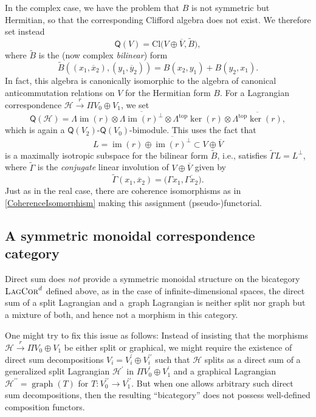 \documentclass[10pt,a4paper]{amsart}
\numberwithin{equation}{section}
\DeclareMathOperator{\im}{\mathrm{im}}
\DeclareMathOperator{\graph}{\mathrm{graph}}
\newcommand{\LagCor}{\textsc{LagCor}}
\newcommand{\Cl}{\mathrm{Cl}}
\begin{document}
In the complex case, we have the problem that $B$ is not symmetric but Hermitian, so that the corresponding Clifford algebra does not exist.
We therefore set instead
\begin{equation*}
 \mathsf{Q}(V) = \Cl\big(V \oplus \overline{V}, \tilde{B}\big),
\end{equation*}
where $\tilde{B}$ is the (now complex \emph{bilinear}) form
\begin{equation*}
 \tilde{B}((x_1, \overline{x}_2), (y_1, \overline{y}_2)) = B(x_2, y_1) + B(y_2, x_1).
\end{equation*}
In fact, this algebra is canonically isomorphic to the algebra of canonical anticommutation relations on $V$ for the Hermitian form $B$.
For a Lagrangian correspondence $\mathcal{H} \stackrel{r}{\to} \Pi V_0 \oplus V_1$, we set
\begin{equation*}
 \textsf{Q}(\mathcal{H}) = \Lambda \im(r) \otimes \overline{\Lambda \im(r)^\perp} \otimes \Lambda^{\mathrm{top}} \ker(r)\otimes \overline{\Lambda^{\mathrm{top}} \ker(r)},
\end{equation*}
which is again a $\textsf{Q}(V_2)$-$\textsf{Q}(V_0)$-bimodule.
This uses the fact that
\begin{equation*}
L = \im(r) \oplus \overline{\im(r)^\perp} \subset V \oplus \overline{V}
\end{equation*}
is a maximally isotropic subspace for the bilinear form $\tilde{B}$, i.e., satisfies $\tilde{\Gamma} L = L^\perp$, where $\tilde{\Gamma}$ is the \emph{conjugate} linear involution of $V \oplus \overline{V}$ given by \[\tilde{\Gamma}(x_1, \overline{x}_2) = \big(\Gamma x_1, \overline{\Gamma x_2}\big).\]
Just as in the real case, there are coherence isomorphisms as in \eqref{CoherenceIsomorphism} making this assignment (pseudo-)functorial.


\subsection{A symmetric monoidal correspondence category}
\label{SectionSymmetricMonoidalVersion}

Direct sum does \emph{not} provide a symmetric monoidal structure on the bicategory $\LagCor^d$ defined above, as in the case of infinite-dimensional spaces, the direct sum of a split Lagrangian and a~graph Lagrangian is neither split nor graph but a mixture of both, and hence not a morphism in this category.

One might try to fix this issue as follows:
Instead of insisting that the morphisms $\mathcal{H} \stackrel{r}{\to} \Pi V_0 \oplus V_1$ be either split or graphical, we might require the existence of direct sum decompositions $V_i = V_i^\prime \oplus V_i^{\prime\prime}$ such that $\mathcal{H}$ splits as a direct sum of a generalized split Lagrangian $\mathcal{H}^\prime$ in $\Pi V_0^\prime \oplus V_1^\prime$ and a graphical Lagrangian $\mathcal{H}^{\prime\prime} = \graph(T)$ for $T\colon V_0^{\prime\prime} \to V_1^{\prime\prime}$.
But when one allows arbitrary such direct sum decompositions, then the resulting ``bicategory'' does not possess well-defined composition functors.
\end{document}
